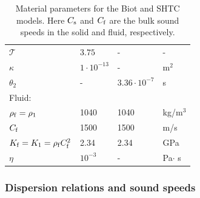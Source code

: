 \documentclass[3p,times,table]{article}
\newcommand{\tort}{{\mathcal{T}}}
\newcommand{\Km}{K_{\rm m}}
\newcommand{\Kf}{K_{\rm f}}
\newcommand{\rhof}{\rho_{\rm f}}
\newcommand{\Cf}{C_{\rm f}}
\begin{document}
\begin{table}[t]
\begin{center}
\begin{tabular}{llll}
			$ \tort $     & $ 3.75 $           &   -       & 
			-                            \\[1mm]
			\rowcolor[HTML]{ECF4FF} 
			$ \kappa $ & $ 1\cdot10^{-13} $      &     -     & m$ ^2 
			$                	\\[1mm]
			\rowcolor[HTML]{CBCEFB}
			$ \theta_2 $       & - &  $ 3.36\cdot10^{-7}$  & s  \\[1mm]
			Fluid:		& & &\\[1mm]
			\rowcolor[HTML]{ECF4FF} 
			$ \rhof=\rho_1 $ & 1040        &     1040       & kg/m$ ^3 
			$              \\[1mm]
			\rowcolor[HTML]{CBCEFB} 
			$ \Cf $ & 1500        &     1500       & 
			m/s                              \\[1mm]
			\rowcolor[HTML]{ECF4FF} 
			$ \Kf =K_1=\rhof \Cf^2$     & 2.34          &   2.34       & 
			GPa                   
			\\[1mm]
			\rowcolor[HTML]{CBCEFB} 
			$ \eta $  & $ 10^{-3} $&    -      & Pa$ \cdot $ s             
			\\[1mm]
			\hline
		\end{tabular}
		\caption{ Material parameters for the Biot and SHTC models. Here 
		$C_{\rm s}$ and $C_{\rm f}$ are the bulk sound speeds in the solid and 
		fluid, respectively.}
		\label{tab:parameters}
	\end{center}
\end{table}


\subsubsection{Dispersion relations and sound speeds}
\end{document}
